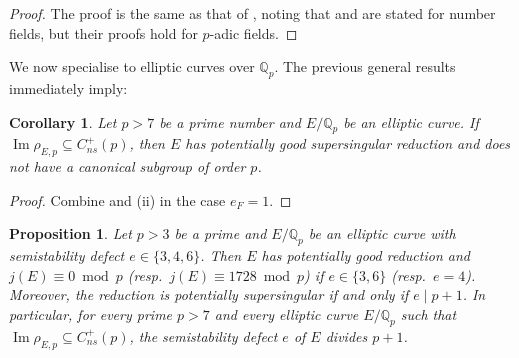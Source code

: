 \documentclass{amsart}
\newtheorem{corollary}[theorem]{Corollary}
\newtheorem{proposition}[theorem]{Proposition}
\theoremstyle{definition}
\newcommand{\Q}{\mathbb{Q}}
\newcommand{\BaseField}{F}
\numberwithin{theorem}{section}
\numberwithin{equation}{section}
\begin{document}
\begin{proof}
	The proof is the same as that of \cite[Theorem 4.5]{furio24}, noting that \cite[Theorem 4.6]{smith23} and \cite[Theorem 3.10]{furiolombardo23} are stated for number fields, but their proofs hold for $p$-adic fields.
\end{proof}


We now specialise to elliptic curves over $\Q_p$. The previous general results immediately imply:
\begin{corollary}\label{cor: supersingular and no canonical subgroup}
    Let $p > 7$ be a prime number and $E/\mathbb{Q}_p$ be an elliptic curve. If $\operatorname{Im}\rho_{E,p} \subseteq C_{ns}^+(p)$, then $E$ has potentially good supersingular reduction and does not have a canonical subgroup of order $p$.
\end{corollary}

\begin{proof}
    Combine  and (ii) in the case $e_\BaseField=1$.
\end{proof}

\begin{proposition}\label{prop: e divides p plus one}
    Let $p>3$ be a prime and $E/\Q_p$ be an elliptic curve with semistability defect $e \in \{3,4,6\}$. 
    Then $E$ has potentially good reduction and $j(E) \equiv 0 \bmod{p}$ (resp.~$j(E) \equiv 1728 \bmod{p}$) if $e \in \{3,6\}$ (resp.~$e=4$).
    Moreover, the reduction is potentially supersingular if and only if $e \mid p+1$. In particular, for every prime $p>7$ and every elliptic curve $E/\Q_p$ such that $\operatorname{Im}\rho_{E,p} \subseteq C_{ns}^+(p)$, the semistability defect $e$ of $E$ divides $p+1$.
\end{proposition}
\end{document}
